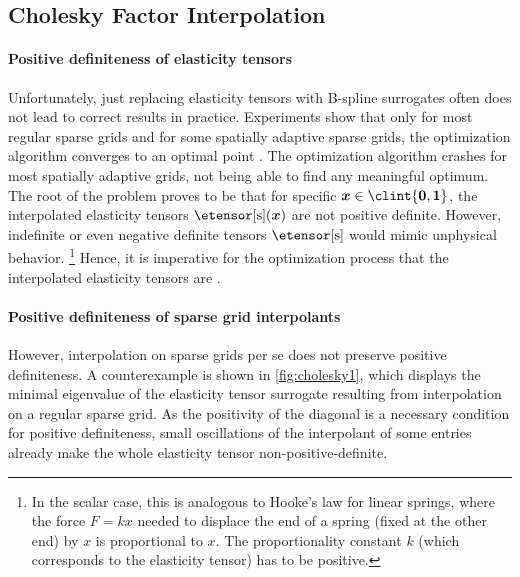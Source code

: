 \breakpagebeforenextheadingtrue
\subsection{Cholesky Factor Interpolation}
\label{sec:623cholesky}

\paragraph{Positive definiteness of elasticity tensors}

Unfortunately, just replacing elasticity tensors with
B-spline surrogates often does not lead to correct results in practice.
Experiments show that only for most regular sparse grids and
for some spatially adaptive sparse grids,
the optimization algorithm converges to an optimal point
\cite{Valentin16Hierarchical}.
The optimization algorithm crashes for most spatially adaptive grids,
not being able to find any meaningful optimum.
%
The root of the problem proves to be that for specific
$\*x \in \clint{\*0, \*1}$,
the interpolated elasticity tensors $\etensorintp(\*x)$ are not
positive definite.
However, indefinite or even negative definite tensors $\etensorintp$
would mimic unphysical behavior.%
\footnote{%
  In the scalar case, this is analogous to Hooke's law for linear springs,
  where the force $F = kx$ needed to displace the end of a spring
  (fixed at the other end) by $x$ is proportional to $x$.
  The proportionality constant $k$ (which corresponds to the elasticity tensor)
  has to be positive.%
}
Hence, it is imperative for the optimization process that
the interpolated elasticity tensors are \spd.

\paragraph{Positive definiteness of sparse grid interpolants}

However, interpolation on sparse grids per se does not preserve
positive definiteness.
A counterexample is shown in \cref{fig:cholesky1},
which displays the minimal eigenvalue of the elasticity tensor surrogate
resulting from interpolation on a regular sparse grid.
As the positivity of the diagonal is a necessary condition
for positive definiteness,
small oscillations of the interpolant of some entries
already make the whole elasticity tensor non-positive-definite.

